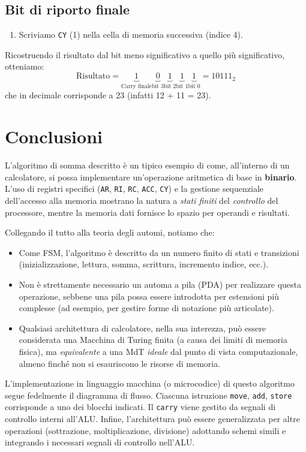 \documentclass[a4paper,12pt]{report}
\begin{document}
\subsection*{Bit di riporto finale}
\begin{enumerate}
    \item Scriviamo \texttt{CY} (1) nella cella di memoria successiva (indice 4).
\end{enumerate}

\noindent
Ricostruendo il risultato dal bit meno significativo a quello più significativo, otteniamo:
\[
\text{Risultato} = 
\underbrace{1}_{\text{Carry finale}}
\underbrace{0}_{\text{bit 3}}
\underbrace{1}_{\text{bit 2}}
\underbrace{1}_{\text{bit 1}}
\underbrace{1}_{\text{bit 0}}
= 10111_2
\]
che in decimale corrisponde a 23 (infatti 12 + 11 = 23).

\section{Conclusioni}
L'algoritmo di somma descritto è un tipico esempio di come, all'interno di un calcolatore, si possa implementare un'operazione aritmetica di base in \textbf{binario}. L'uso di registri specifici (\texttt{AR}, \texttt{RI}, \texttt{RC}, \texttt{ACC}, \texttt{CY}) e la gestione sequenziale dell'accesso alla memoria mostrano la natura a \textit{stati finiti} del \textit{controllo} del processore, mentre la memoria dati fornisce lo spazio per operandi e risultati. 

Collegando il tutto alla teoria degli automi, notiamo che:
\begin{itemize}
    \item Come FSM, l'algoritmo è descritto da un numero finito di stati e transizioni (inizializzazione, lettura, somma, scrittura, incremento indice, ecc.).
    \item Non è strettamente necessario un automa a pila (PDA) per realizzare questa operazione, sebbene una pila possa essere introdotta per estensioni più complesse (ad esempio, per gestire forme di notazione più articolate).
    \item Qualsiasi architettura di calcolatore, nella sua interezza, può essere considerata una Macchina di Turing finita (a causa dei limiti di memoria fisica), ma \textit{equivalente} a una MdT \emph{ideale} dal punto di vista computazionale, almeno finché non si esauriscono le risorse di memoria.
\end{itemize}

L'implementazione in linguaggio macchina (o microcodice) di questo algoritmo segue fedelmente il diagramma di flusso. Ciascuna istruzione \texttt{move}, \texttt{add}, \texttt{store} corrisponde a uno dei blocchi indicati. Il \texttt{carry} viene gestito da segnali di controllo interni all'ALU. Infine, l'architettura può essere generalizzata per altre operazioni (sottrazione, moltiplicazione, divisione) adottando schemi simili e integrando i necessari segnali di controllo nell'ALU.
\end{document}
